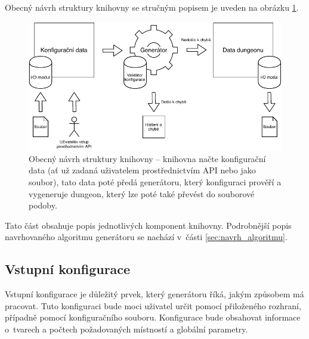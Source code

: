 Obecný návrh struktury knihovny se stručným popisem je uveden na obrázku \ref{img:lib_design}.
\begin{figure}[hbt]
    \centering
    \includegraphics[width=1.0\textwidth]{obrazky/navrh_knihovny.pdf}
    \caption{Obecný návrh struktury knihovny -- knihovna načte konfigurační data (ať už zadaná uživatelem prostřednictvím API nebo jako soubor), tato data poté předá generátoru, který konfiguraci prověří a vygeneruje dungeon, který lze poté také převést do souborové podoby.}
    \label{img:lib_design}
\end{figure}
Tato část obsahuje popis jednotlivých komponent knihovny.
Podrobnější popis navrhovaného algoritmu generátoru se nachází v~části \ref{sec:navrh_algoritmu}.


\subsection{Vstupní konfigurace}


Vstupní konfigurace je důležitý prvek, který generátoru říká, jakým způsobem má pracovat.
Tuto konfiguraci bude moci uživatel určit pomocí přiloženého rozhraní, případně pomocí konfiguračního souboru.
Konfigurace bude obsahovat informace o~tvarech a počtech požadovaných místností a globální parametry.


